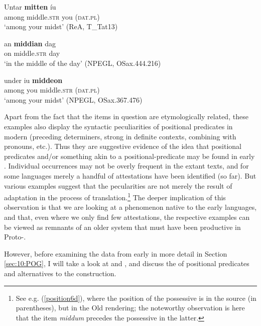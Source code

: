 \documentclass[output=paper,colorlinks,citecolor=brown]{langscibook}
\begin{document}
\begin{exe}
\begin{xlist}
      \ex \gll Untar \textbf{mitten}  íu      \\  
        among middle.\textsc{str} you  (\textsc{dat.pl}) \\ 
       \glt  `among your midst' (ReA, T\_Tat13)
    \end{xlist} 

   \ex \label{position6Sx} 
    \begin{xlist}

    \ex \gll an \textbf{middian} dag     \\ 
      on middle.\textsc{str} day  \\ 
        \glt  `in the middle of the day' (NPEGL, OSax.444.216)

     \ex \gll under iu \textbf{middeon}   \\ 
       among you middle.\textsc{str} (\textsc{dat.pl})   \\  
       \glt  `among your midst' (NPEGL, OSax.367.476)   

     \end{xlist}  
\end{exe}

Apart from the fact that the items in question are etymologically related, these examples also display the syntactic peculiarities of positional predicates in modern  (preceding determiners, strong  in definite contexts, combining with pronouns, etc.). Thus they are suggestive evidence of the idea that positional predicates and/or something akin to a positional-predicate  may be found in early .  
Individual occurrences may not be overly frequent in the extant texts, and for some languages  merely a handful of attestations have been identified (so far). But various examples suggest that the pecularities are not merely the result of adaptation in the process of translation.\footnote{See e.g. (\ref{position6d}), where the position of the possessive is  in the  source (in parentheses), but  in the Old  rendering; the noteworthy observation is here that the item \textit{middum} precedes the possessive in the latter. } 
The deeper implication of this observation is that we are looking at a phenomenon native to the early  languages, and that, even where we only find few attestations, the respective examples can be viewed as remnants of an older system that must have been productive in Proto-. 

However, before examining the data from early  in more detail in Section \ref{sec:10:POG},  I will take a look at  and , and discuss the  of positional predicates and alternatives to the  construction.
\end{document}

